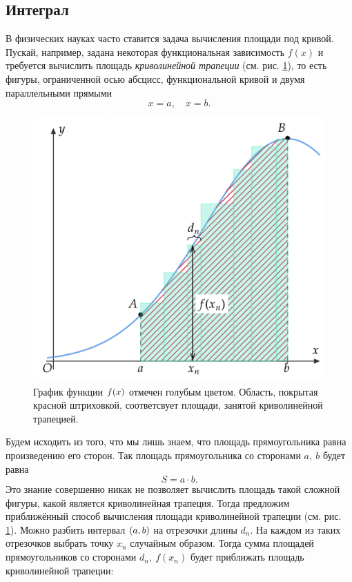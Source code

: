 \documentclass[12pt]{article}
\begin{document}
\subsection{Интеграл}
В физических науках часто ставится задача вычисления площади под кривой. Пускай, например, задана некоторая функциональная зависимость $f(x)$ и требуется вычислить площадь \emph{криволинейной трапеции} (см. рис. \ref{fig:2}), то есть фигуры, ограниченной осью абсцисс, функциональной кривой и двумя параллельными прямыми 
\begin{equation}
    x = a, \quad x = b.
\end{equation}
\begin{figure}
    \centering
    \includegraphics[width = 1\textwidth]{fig2.png}
    \caption{График функции $f\qty(x)$ отмечен голубым цветом. Область, покрытая красной штриховкой, соответсвует площади, занятой криволинейной трапецией.}
    \label{fig:2}
\end{figure}
Будем исходить из того, что мы лишь знаем, что площадь прямоугольника равна произведению его сторон. Так площадь прямоугольника со сторонами $a,\ b$ будет равна
\begin{equation}
    S = a\cdot b.
\end{equation}
Это знание совершенно никак не позволяет вычислить площадь такой сложной фигуры, какой является криволинейная трапеция. Тогда предложим приближённый способ вычисления площади криволинейной трапеции (см. рис. \ref{fig:2}). Можно разбить интервал $\qty(a,b)$ на отрезочки длины $d_n$. На каждом из таких отрезочков выбрать точку $x_n$ случайным образом. Тогда сумма площадей прямоугольников со сторонами $d_n,\ f(x_n)$ будет приближать площадь криволинейной трапеции:
\end{document}

